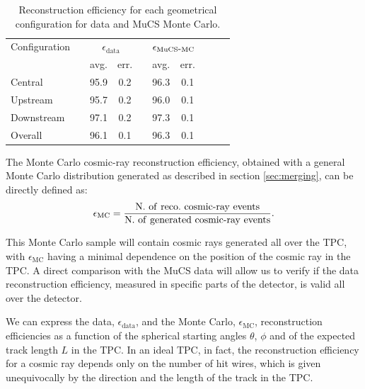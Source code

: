 \documentclass[a4paper]{scrartcl}
\def\myhyphen{{\hbox{-}}}
\begin{document}
\begin{table}[htbp]
  \centering
  \begin{tabular}{lccccccccc}
    \toprule
    Configuration & \phantom{a} & \multicolumn{2}{c}{$\epsilon_{\mathrm{data}}$} & \phantom{a} & \multicolumn{2}{c}{$\epsilon_{\mathrm{MuCS\myhyphen MC}}$} \\
     \cmidrule{3-4} \cmidrule{6-7}
      &  & avg. & err. & & avg. & err.  \\
    \midrule
    Central & & 95.9 & 0.2 & & 96.3 & 0.1 \\
    Upstream & & 95.7 & 0.2 & & 96.0 & 0.1 \\
    Downstream & & 97.1 & 0.2 & & 97.3 & 0.1 \\
    \midrule
    Overall & & 96.1 & 0.1 & & 96.3 & 0.1 \\
    \bottomrule
  \end{tabular}
  \caption{Reconstruction efficiency for each geometrical configuration for data and MuCS Monte Carlo.}\label{tab:config}
\end{table}


The Monte Carlo cosmic-ray reconstruction efficiency, obtained with a general Monte Carlo distribution generated as described in section \ref{sec:merging}, can be directly defined as:
\begin{equation}
  \epsilon_{\mathrm{MC}} = \frac{\mathrm{N.~of~reco.~cosmic\myhyphen ray~events}}{\mathrm{N.~of~generated~cosmic\myhyphen ray~events}}.
\end{equation}

This Monte Carlo sample will contain cosmic rays generated all over the TPC, with $\epsilon_{\mathrm{MC}}$ having a minimal dependence on the position of the cosmic ray in the TPC. A direct comparison with the MuCS data will allow us to verify if the data reconstruction efficiency, measured in specific parts of the detector, is valid all over the detector.

We can express the data, $\epsilon_{\mathrm{data}}$, and the Monte Carlo, $\epsilon_{\mathrm{MC}}$, reconstruction efficiencies as a function of the spherical starting angles $\theta$, $\phi$ and of the expected track length $L$ in the TPC. In an ideal TPC, in fact, the reconstruction efficiency for a cosmic ray depends only on the number of hit wires, which is given unequivocally by the direction and the length of the track in the TPC.
\end{document}

